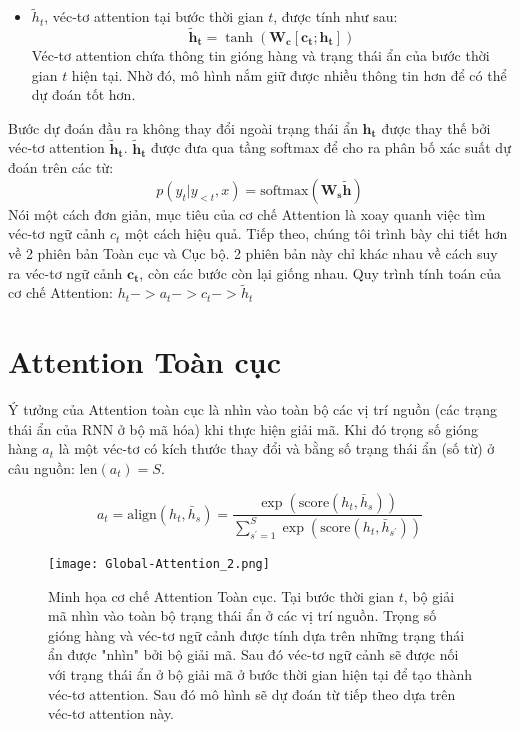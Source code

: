 \begin{itemize}
	\item $\tilde{h}_t$, véc-tơ attention tại bước thời gian $t$, được tính như sau:
	\begin{equation}
	\boldsymbol{\tilde{h}_t} = \tanh(\bm{W_c}[\bm{c_t};\bm{h_t}])
	\end{equation}
	Véc-tơ attention chứa thông tin gióng hàng và trạng thái ẩn của bước thời gian $t$ hiện tại. Nhờ đó, mô hình nắm giữ được nhiều thông tin hơn để có thể dự đoán tốt hơn.
\end{itemize}
Bước dự đoán đầu ra không thay đổi ngoài trạng thái ẩn $\bm{h_t}$ được thay thế bởi véc-tơ attention $\bm{\tilde{h}_t}$. $\bm{\tilde{h}_t}$ được đưa qua tầng softmax để cho ra phân bố xác suất dự đoán trên các từ:
\begin{equation}
p(y_t | y_{<t}, x) = \text{softmax}(\bm{W_s\tilde{h}})
\end{equation}
Nói một cách đơn giản, mục tiêu của cơ chế Attention là xoay quanh việc tìm véc-tơ ngữ cảnh $c_t$ một cách hiệu quả.
Tiếp theo, chúng tôi trình bày chi tiết hơn về 2 phiên bản Toàn cục và Cục bộ. 2 phiên bản này chỉ khác nhau về cách suy ra véc-tơ ngữ cảnh $\bm{c_t}$, còn các bước còn lại giống nhau.
Quy trình tính toán của cơ chế Attention: $h_t -> a_t -> c_t -> \tilde{h}_t$
\section{Attention Toàn cục}
Ý tưởng của Attention toàn cục là nhìn vào toàn bộ các vị trí nguồn (các trạng thái ẩn của RNN ở bộ mã hóa) khi thực hiện giải mã.
Khi đó trọng số gióng hàng $a_t$ là một véc-tơ có kích thước thay đổi và bằng số trạng thái ẩn (số từ) ở câu nguồn: $\text{len}(a_t) = S$.

\begin{equation}
a_t = \text{align}(h_t, \bar{h}_s) = \frac{\exp\left(\text{score}(h_t, \bar{h}_s)\right)}{\sum^{S}_{s^{'}=1}\exp\left(\text{score}(h_t, \bar{h}_{s^{'}})\right)}
\end{equation}

\begin{figure}
	\centering
	\texttt{[image: Global-Attention\_2.png]}
	\caption[Minh họa cơ chế Attention Toàn cục.]{Minh họa cơ chế Attention Toàn cục. Tại bước thời gian $t$, bộ giải mã nhìn vào toàn bộ trạng thái ẩn ở các vị trí nguồn. Trọng số gióng hàng và véc-tơ ngữ cảnh được tính dựa trên những trạng thái ẩn được "nhìn" bởi bộ giải mã. Sau đó véc-tơ ngữ cảnh sẽ được nối với trạng thái ẩn ở bộ giải mã ở bước thời gian hiện tại để tạo thành véc-tơ attention. Sau đó mô hình sẽ dự đoán từ tiếp theo dựa trên véc-tơ attention này.}
	\label{fig_Global_Attention}
\end{figure}

